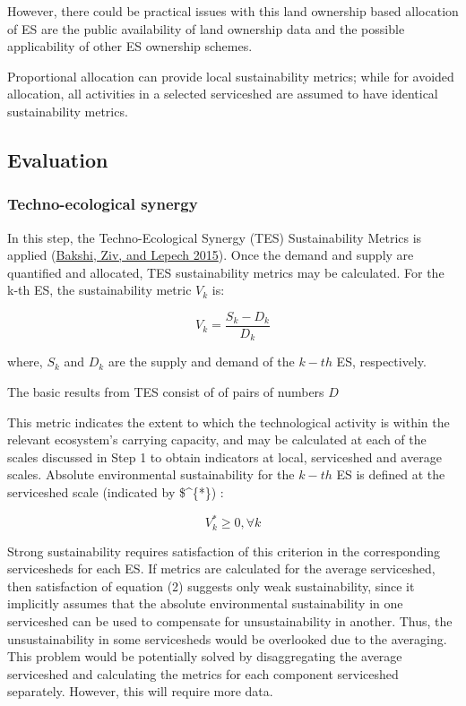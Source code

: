 \documentclass[
  14pt,
]{extarticle}
\begin{document}
However, there could be practical issues with this land ownership based allocation of ES are the public availability of land ownership data and the possible applicability of other ES ownership schemes.

Proportional allocation can provide local sustainability metrics; while for avoided allocation, all activities in a selected serviceshed are assumed to have identical sustainability metrics.

\hypertarget{evaluation}{%
\subsection{Evaluation}\label{evaluation}}

\hypertarget{techno-ecological-synergy}{%
\subsubsection{Techno-ecological synergy}\label{techno-ecological-synergy}}

In this step, the Techno-Ecological Synergy (TES) Sustainability Metrics is applied (\protect\hyperlink{ref-Bakshi2015}{Bakshi, Ziv, and Lepech 2015}).
Once the demand and supply are quantified and allocated, TES sustainability metrics may be calculated.
For the k-th ES, the sustainability metric \(V_{k}\) is:

\[
V_{k} = \frac{S_{k} - D_{k}}{D_{k}}
\]

where, \(S_{k}\) and \(D_{k}\) are the supply and demand of the \(k-th\) ES, respectively.

The basic results from TES consist of of pairs of numbers \({D}\)

This metric indicates the extent to which the technological activity is within the relevant ecosystem's carrying capacity, and may be calculated at each of the scales discussed in Step 1 to obtain indicators at local, serviceshed and average scales.
Absolute environmental sustainability for the \(k-th\) ES is defined at the serviceshed scale (indicated by \$\^{}\{*\}) :

\[
V_{k}^{*} \geq 0, \forall k
\]

Strong sustainability requires satisfaction of this criterion in the corresponding servicesheds for each ES.
If metrics are calculated for the average serviceshed, then satisfaction of equation (2) suggests only weak sustainability, since it implicitly assumes that the absolute environmental sustainability in one serviceshed can be used to compensate for unsustainability in another.
Thus, the unsustainability in some servicesheds would be overlooked due to the averaging.
This problem would be potentially solved by disaggregating the average serviceshed and calculating the metrics for each component serviceshed separately.
However, this will require more data.
\end{document}
